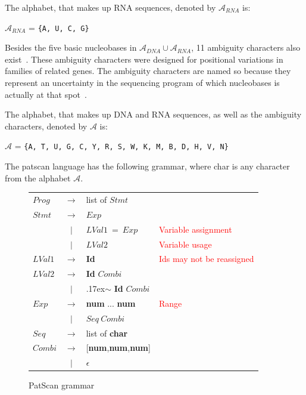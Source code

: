 \documentclass[12pt]{article}
\theoremstyle{definition}
\begin{document}
\begin{definition}
The alphabet, that makes up RNA sequences, denoted by $\mathcal{A}_{RNA}$ is:
\begin{center}
$\mathcal{A}_{RNA}$ = \texttt{\{A, U, C, G\}}
\end{center}
\end{definition}

Besides the five basic nucleobases in $\mathcal{A}_{DNA} \cup \mathcal{A}_{RNA}$, 11 ambiguity characters also exist~\cite{DNA-sciencedaily}. These ambiguity characters were designed for positional variations in families of related genes. The ambiguity characters are named so because they represent an uncertainty in the sequencing program of which nucleobases is actually at that spot~\cite{ambiguitycodes, dna-base-error-rate}.

\begin{definition}
The alphabet, that makes up DNA and RNA sequences, as well as the ambiguity characters, denoted by $\mathcal{A}$ is:
\begin{center}
$\mathcal{A}$ = \texttt{\{A, T, U, G, C, Y, R, S, W, K, M, B, D, H, V, N\}}
\end{center}
\end{definition}

The patscan language has the following grammar, where char is any character from the alphabet $\mathcal{A}$.

\begin{figure}[H]
\begin{center}
\begin{tabular}{|lcll|}
	\hline
	$Prog$ &  $\rightarrow$ & list of $Stmt$ & \\
	$Stmt$ & $\rightarrow$ & $Exp$ & \\
	\enspace & $|$ & $LVal1\ =\ Exp$ &  \textcolor{red}{Variable assignment} \\
	\enspace & $|$ & $LVal2$ & \textcolor{red}{Variable usage} \\
	$LVal1$ & $\rightarrow$ & \textbf{Id} & \textcolor{red}{Ids may not be reassigned}\\
	$LVal2$ & $\rightarrow$ & \textbf{Id} $Combi$ & \\
	\enspace & $|$ & {\raise.17ex\hbox{$\scriptstyle\mathtt{\sim}$}} \textbf{Id} $Combi$ & \\
	$Exp$ & $\rightarrow$ & \textbf{num} ... \textbf{num} & \textcolor{red}{Range} \\
	\enspace & $|$ & $Seq\ Combi$ & \\
	$Seq$ & $\rightarrow$ & list of \textbf{char} & \\
	$Combi$ & $\rightarrow$ & [\textbf{num},\textbf{num},\textbf{num}] & \\
	\enspace & $|$ & $\epsilon$ & \\
	\hline
\end{tabular}
\end{center}
\caption{PatScan grammar}
\end{figure}
\end{document}
